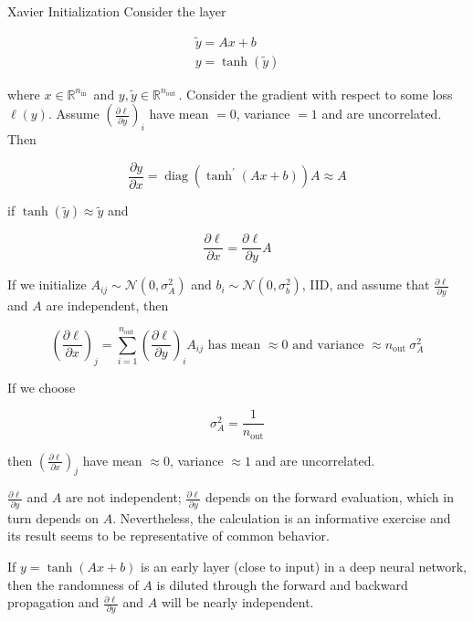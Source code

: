 \begin{frame}[allowframebreaks]

\begin{mydefinitionblock}{6.33}{Xavier Initialization}
    Consider the layer

    $$
    \begin{gathered}
    \tilde{y}=A x+b \\
    y=\tanh (\tilde{y})
    \end{gathered}
    $$

    where $x \in \mathbb{R}^{n_{\text {in }}}$ and $y, \tilde{y} \in \mathbb{R}^{n_{\text {out }}}$. Consider the gradient with respect to some loss $\ell(y)$. Assume $\left(\frac{\partial \ell}{\partial y}\right)_{i}$ have mean $=0$, variance $=1$ and are uncorrelated. Then

    $$
    \frac{\partial y}{\partial x}=\operatorname{diag}\left(\tanh ^{\prime}(A x+b)\right) A \approx A
    $$

    if $\tanh (\tilde{y}) \approx \tilde{y}$ and

    $$
    \frac{\partial \ell}{\partial x}=\frac{\partial \ell}{\partial y} A
    $$

    If we initialize $A_{i j} \sim \mathcal{N}\left(0, \sigma_{A}^{2}\right)$ and $b_{i} \sim \mathcal{N}\left(0, \sigma_{b}^{2}\right)$, IID, and assume that $\frac{\partial \ell}{\partial y}$ and $A$ are independent, then

    $$
    \left(\frac{\partial \ell}{\partial x}\right)_{j}=\sum_{i=1}^{n_{\text {out }}}\left(\frac{\partial \ell}{\partial y}\right)_{i} A_{i j} \text { has mean } \approx 0 \text { and variance } \approx n_{\text {out }} \sigma_{A}^{2}
    $$

    If we choose

    $$
    \sigma_{A}^{2}=\frac{1}{n_{\mathrm{out}}}
    $$

    then $\left(\frac{\partial \ell}{\partial x}\right)_{j}$ have mean $\approx 0$, variance $\approx 1$ and are uncorrelated.

    \par\noindent\textcolor{gray}{\hdashrule{\textwidth}{0.4pt}{1pt 2pt}}

    $\frac{\partial \ell}{\partial y}$ and $A$ are not independent; $\frac{\partial \ell}{\partial y}$ depends on the forward evaluation, which in turn depends on $A$. Nevertheless, the calculation is an informative exercise and its result seems to be representative of common behavior.

    If $y=\tanh (A x+b)$ is an early layer (close to input) in a deep neural network, then the randomness of $A$ is diluted through the forward and backward propagation and $\frac{\partial \ell}{\partial y}$ and $A$ will be nearly independent.


\end{mydefinitionblock}
\end{frame}
